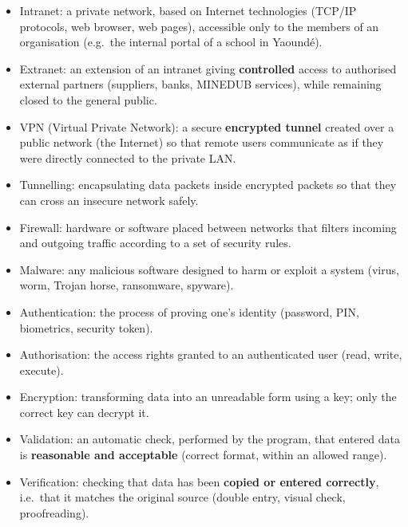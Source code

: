 \documentclass[11pt]{article}
\newcommand{\cle}[1]{{\popxbold\color{popdark}#1}}
\begin{document}
\begin{aretenir}
\begin{itemize}
  \item \cle{Intranet}: a private network, based on Internet technologies (TCP/IP protocols, web browser, web pages), accessible only to the members of an organisation (e.g.\ the internal portal of a school in Yaound\'e).
  \item \cle{Extranet}: an extension of an intranet giving \textbf{controlled} access to authorised external partners (suppliers, banks, MINEDUB services), while remaining closed to the general public.
  \item \cle{VPN} (Virtual Private Network): a secure \textbf{encrypted tunnel} created over a public network (the Internet) so that remote users communicate as if they were directly connected to the private LAN.
  \item \cle{Tunnelling}: encapsulating data packets inside encrypted packets so that they can cross an insecure network safely.
  \item \cle{Firewall}: hardware or software placed between networks that filters incoming and outgoing traffic according to a set of security rules.
  \item \cle{Malware}: any malicious software designed to harm or exploit a system (virus, worm, Trojan horse, ransomware, spyware).
  \item \cle{Authentication}: the process of proving one's identity (password, PIN, biometrics, security token).
  \item \cle{Authorisation}: the access rights granted to an authenticated user (read, write, execute).
  \item \cle{Encryption}: transforming data into an unreadable form using a key; only the correct key can decrypt it.
  \item \cle{Validation}: an automatic check, performed by the program, that entered data is \textbf{reasonable and acceptable} (correct format, within an allowed range).
  \item \cle{Verification}: checking that data has been \textbf{copied or entered correctly}, i.e.\ that it matches the original source (double entry, visual check, proofreading).
\end{itemize}
\end{aretenir}
\end{document}
